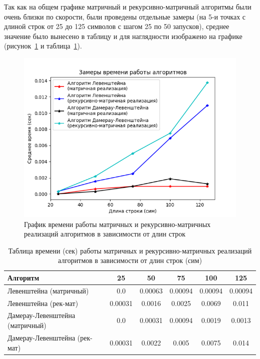 \hspace{1.25cm}
Так как на общем графике матричный и рекурсивно-матричный алгоритмы были очень близки по скорости, были проведены отдельные замеры (на 5-и точках с длиной строк от 25 до 125 символов с шагом 25 по 50 запусков), среднее значение было вынесено в таблицу и для наглядности изображено на графике (рисунок~\ref{fig:graph_mat_rec-mat} и таблица~\ref{table:table_mat_rec-mat}).

\begin{figure}[H]
    \centering
    \includegraphics[width=1\textwidth]{img/graph_mat_rec-mat.png}
    \caption{График времени работы матричных и рекурсивно-матричных реализаций алгоритмов в зависимости от длин строк}
    \label{fig:graph_mat_rec-mat}
\end{figure}

\begin{table}[H]
    \centering
    \begin{tabular}{|l|c|c|c|c|c|}
        \hline
        \textbf{Алгоритм} & \textbf{25} & \textbf{50} & \textbf{75} & \textbf{100} & \textbf{125}\\
        \hline
        Левенштейна (матричный) & 0.0 & 0.00063 & 0.00094 & 0.00094 & 0.00094 \\
        Левенштейна (рек-мат) & 0.00031 & 0.0016 & 0.0025 & 0.0069 & 0.011 \\
        Дамерау-Левенштейна (матричный) & 0.0 & 0.00031 & 0.00094 & 0.0019 & 0.0013 \\
        Дамерау-Левенштейна (рек-мат) & 0.00031 & 0.0022 & 0.005 & 0.0075 & 0.014 \\
        \hline
    \end{tabular}
    \caption{Таблица времени (сек) работы матричных и рекурсивно-матричных реализаций алгоритмов в зависимости от длин строк (сим)}
    \label{table:table_mat_rec-mat}
\end{table}

